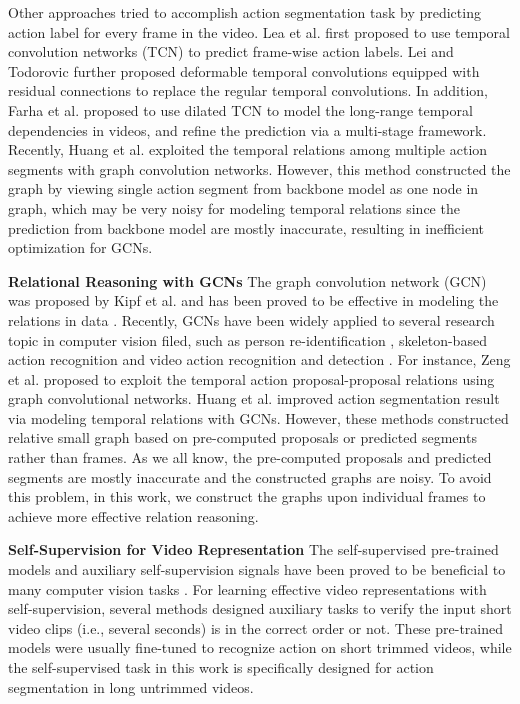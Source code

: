 \documentclass[letterpaper]{article} \usepackage{aaai21}  \usepackage{times}  \usepackage{helvet} \usepackage{courier}  \usepackage[hyphens]{url}  \usepackage{graphicx} \usepackage{mathtools}
\begin{document}
Other approaches tried to accomplish action segmentation task by predicting action label for every frame in the video. Lea et al. \cite{lea2017temporal} first proposed to use temporal convolution networks (TCN) to predict frame-wise action labels. Lei and Todorovic \cite{lei2018temporal} further proposed deformable temporal convolutions equipped with residual connections to replace the regular temporal convolutions. In addition, Farha et al. \cite{farha2019ms} proposed to use dilated TCN to model the long-range temporal dependencies in videos, and refine the prediction via a multi-stage framework. Recently, Huang et al. \cite{huang2020improving} exploited the temporal relations among multiple action segments with graph convolution networks. However, this method constructed the graph by viewing single action segment from backbone model as one node in graph, which may be very noisy for modeling temporal relations since the prediction from backbone model are mostly inaccurate, resulting in inefficient optimization for GCNs.

\noindent
\textbf{Relational Reasoning with GCNs} 
The graph convolution network (GCN) was proposed by Kipf et al. \cite{kipf2016semi} and has been proved to be effective in modeling the relations in data \cite{li2018beyond,liang2018symbolic}. Recently, GCNs have been widely applied to several research topic in computer vision filed, such as person re-identification \cite{shen2018person}, skeleton-based action recognition \cite{yan2018spatial} and video action recognition and detection \cite{wang2018videos,zhang2020temporal,zhang2019structured,zeng2019graph}. For instance, Zeng et al. \cite{zeng2019graph} proposed to exploit the temporal action proposal-proposal relations using graph convolutional networks. Huang et al. \cite{huang2020improving} improved action segmentation result via modeling temporal relations with GCNs. However, these methods constructed relative small graph based on pre-computed proposals or predicted segments rather than frames. As we all know, the pre-computed proposals and predicted segments are mostly inaccurate and the constructed graphs are noisy. To avoid this problem, in this work, we construct the graphs upon individual frames to achieve more effective relation reasoning.

\noindent
\textbf{Self-Supervision for Video Representation}
The self-supervised pre-trained models and auxiliary self-supervision signals have been proved to be beneficial to many computer vision tasks \cite{doersch2015unsupervised,gidaris2018unsupervised,hu2019deep,hu2020discriminative}. For learning effective video representations with self-supervision, several methods \cite{misra2016shuffle,lee2017unsupervised,fernando2017self} designed auxiliary tasks to verify the input short video clips (i.e., several seconds) is in the correct order or not. These pre-trained models were usually fine-tuned to recognize action on short trimmed videos, while the self-supervised task in this work is specifically designed for action segmentation in long untrimmed videos.
\end{document}
